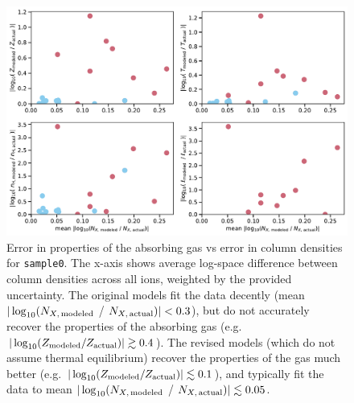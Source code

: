 \documentclass[fleqn,usenatbib]{mnras}
\begin{document}
\begin{figure}
    \centering
    \includegraphics[width=\textwidth]{figures/sample0/error_vs_error.pdf}
    \caption{
    Error in properties of the absorbing gas vs error in column densities for \texttt{sample0}.
    The x-axis shows average log-space difference between column densities across all ions, weighted by the provided uncertainty.
    The original models fit the data decently (mean $\vert \log_{10}( N_{X,\,{\rm modeled}}$ / $N_{X,\,{\rm actual}}) \vert < 0.3$), but do not accurately recover the properties of the absorbing gas (e.g. $\vert \log_{10}( Z_{\rm modeled} / Z_{\rm actual}) \vert \gtrsim 0.4$).
    The revised models (which do not assume thermal equilibrium) recover the properties of the gas much better (e.g. $\vert \log_{10}( Z_{\rm modeled} / Z_{\rm actual}) \vert \lesssim 0.1$), and typically fit the data to mean $\vert \log_{10}( N_{X,\,{\rm modeled}}$ / $N_{X,\,{\rm actual}}) \vert \lesssim 0.05$.
    }
    \label{f: error vs error}
\end{figure}
\end{document}
